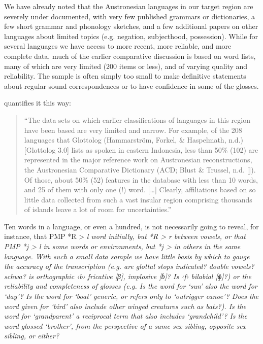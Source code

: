 We have already noted that the Austronesian languages in our
target region are severely under documented,
with very few published grammars or dictionaries,
a few short grammar
and phonology sketches, and a few additional papers on other
languages about limited topics (e.g. negation, subjecthood, possession).
While for several languages we have access to more recent,
more reliable, and more complete data,
much of the earlier comparative discussion is based on word lists,
many of which are very limited (200 items or less),
and of varying quality and reliability.
The sample is often simply too small to make definitive statements
about regular sound correspondences or to have confidence in
some of the glosses.

\citet[8]{Klamer2019} quantifies it this way:

\begin{quote}
	“The data sets on which earlier classifications of languages
	in this region have been based are very limited and narrow.
	For example, of the 208 languages that Glottolog
	(Hammarström, Forkel, {\&} Haspelmath, n.d.) [Glottolog 3.0] lists as spoken
	in eastern Indonesia, less than 50{\%} (102) are represented in the major reference
	work on Austronesian reconstructions,
	the Austronesian Comparative Dictionary
	(ACD; Blust {\&} Trussel, n.d. [\citet{BlustTrussel2020}]).
	Of those, about 50{\%} (52) features in the database with less
	than 10 words, and 25 of them with only one (!) word.
	[{\ldots}] Clearly, affiliations based on so little data collected
	from such a vast insular region comprising thousands of islands
	leave a lot of room for uncertainties.” \citep[8]{Klamer2019}
\end{quote}

Ten words in a language,
or even a hundred,
is not necessarily going to reveal,
for instance, that PMP *R > \it{l} word initially,
but *R > \it{r} between vowels,
or that PMP *j > \it{l} in some words or environments,
but *j > {\0} in others in the same language.
With such a small data sample we have little basis by which
to gauge the accuracy of the transcription (e.g.
are glottal stops indicated? double vowels? schwa? is orthographic
‹b› fricative [β], implosive [ɓ]?
Is ‹f› bilabial [ɸ]?) or the reliability
and completeness of glosses (e.g.
Is the word for ‘sun’ also the word for ‘day’? Is the word for
‘boat’ generic, or refers only to ‘outrigger canoe’? Does the word given for
‘bird’ also include other winged creatures such as bats?).
Is the word for ‘grandparent’ a reciprocal term that also includes
‘grandchild’? Is the word glossed ‘brother’,
from the perspective of a same sex sibling,
opposite sex sibling, or either?

